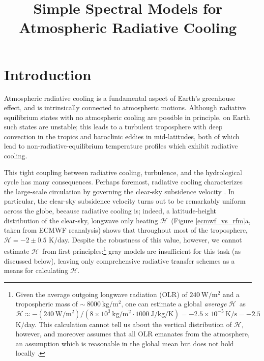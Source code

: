\documentclass{ametsoc}
\title{Simple Spectral Models for Atmospheric Radiative Cooling}
\affiliation{Princeton University, Princeton, New Jersey}
\newcommand{\second}{\ensuremath{\mathrm{s}}}
\newcommand{\kg}{\ensuremath{\mathrm{kg}}}
\newcommand{\meter}{\ensuremath{\mathrm{m}}}
\newcommand{\Kelvin}{\ensuremath{\mathrm{K}}}
\newcommand{\Wmsq}{\ensuremath{\mathrm{W/m^2}}}
\newcommand{\joule}{\ensuremath{\mathrm{J}}}
\newcommand{\ch}{\ensuremath{\mathcal{H}}}
\begin{document}
\maketitle


%
\section {Introduction}
Atmospheric radiative cooling is a fundamental aspect of Earth's greenhouse effect, and is intrinsically connected to atmospheric motions. Although  radiative equilibrium  states with no atmospheric cooling are possible in principle, on Earth such states are unstable; this leads to a turbulent troposphere with deep convection in the tropics and baroclinic eddies in mid-latitudes, both of which lead to non-radiative-equilibrium temperature profiles which exhibit radiative cooling.

This tight coupling between radiative cooling, turbulence, and the hydrological cycle has many consequences. Perhaps foremost,  radiative cooling characterizes the large-scale circulation by governing the clear-sky subsidence velocity \citep[e.g.][]{mapes2001}. In particular, the clear-sky subsidence velocity turns out to be remarkably uniform across the globe, because radiative cooling is; indeed, a latitude-height distribution of the clear-sky, longwave only heating  \ch\ (Figure \ref{ecmwf_vs_rfm}a, taken from ECMWF reanalysis) shows that throughout most of the troposphere, $\ch  =  -2 \pm 0.5 $ K/day.  Despite the robustness of this value, however, we cannot estimate \ch\ from first principles:\footnote{Given the average outgoing longwave radiation (OLR) of $240\ \Wmsq$ and a tropospheric mass of $\sim\ 8000\ \kg/\meter^2$, one can estimate a global \emph{average} \ch\  as $\ch \approx - (240\ \Wmsq)/(8\times 10^3\ \kg/\meter^2 \cdot 1000\ \joule/\kg/\Kelvin) = - 2.5 \times 10^{-5} \ \Kelvin/\second = -2.5$ K/day. This calculation cannot tell us about the vertical distribution of \ch, however, and moreover assumes that all OLR emanates from the atmosphere, an  assumption which is reasonable  in the global mean but does not hold locally \citep[][]{costa2012}.} 
gray models are insufficient for this task (as discussed below), leaving only comprehensive radiative transfer schemes as a means for calculating \ch.
\end{document}
